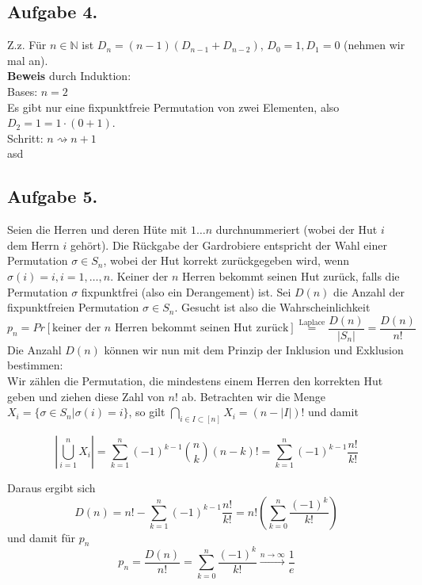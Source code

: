 \documentclass[11pt,a4paper,ngerman]{article}
\begin{document}
\subsection*{Aufgabe 4.}
Z.z. Für $n \in \mathbb{N}$ ist $D_n = (n-1)(D_{n-1} + D_{n-2})$, $D_0 = 1, D_1 = 0$ (nehmen wir mal an). \\

\textbf{Beweis} durch Induktion: \\
Bases: $n = 2$ \\
Es gibt nur eine fixpunktfreie Permutation von zwei Elementen, also
$D_2 = 1 = 1 \cdot (0 + 1)$. \\

Schritt: $n \rightsquigarrow n+1$ \\
asd

\subsection*{Aufgabe 5.}
Seien die Herren und deren Hüte mit $1 \ldots n$ durchnummeriert (wobei der Hut $i$ dem Herrn $i$ gehört).
Die Rückgabe der Gardrobiere entspricht der Wahl einer Permutation $\sigma \in S_n$, wobei
der Hut korrekt zurückgegeben wird, wenn $\sigma(i) = i, i = 1,\ldots,n$. Keiner der $n$ Herren bekommt
seinen Hut zurück, falls die Permutation $\sigma$ fixpunktfrei (also ein Derangement) ist. Sei $D(n)$ die
Anzahl der fixpunktfreien Permutation $\sigma \in S_n$.
Gesucht ist also die Wahrscheinlichkeit
$$p_n = Pr[\text{keiner der $n$ Herren bekommt seinen Hut zurück}] \stackrel{\text{Laplace}}{=} \frac{D(n)}{|S_n|} = \frac{D(n)}{n!}$$
Die Anzahl $D(n)$ können wir nun mit dem Prinzip der Inklusion und Exklusion bestimmen: \\
Wir zählen die Permutation, die mindestens einem Herren den korrekten Hut geben und ziehen diese Zahl von $n!$ ab. Betrachten wir die Menge $X_i = \{\sigma \in S_n | \sigma(i) = i \}$, so gilt $\bigcap_{i \in I \subset [n]} X_i = (n - |I|)!$ und damit

$$ |\bigcup_{i = 1}^n X_i | = \sum_{k=1}^n (-1)^{k-1} \binom{n}{k} (n-k)! =  \sum_{k=1}^n (-1)^{k-1} \frac{n!}{k!}$$

Daraus ergibt sich 
$$D(n) = n! - \sum_{k=1}^n (-1)^{k-1} \frac{n!}{k!} = n! \left(\sum_{k=0}^n \frac{ (-1)^{k} }{k!} \right)$$
und damit für $p_n$
$$ p_n = \frac{D(n)}{n!} = \sum_{k=0}^n \frac{ (-1)^{k} }{k!} \stackrel{n \to \infty}{\longrightarrow} \frac{1}{e}$$
\label{LastPage}
\end{document}
